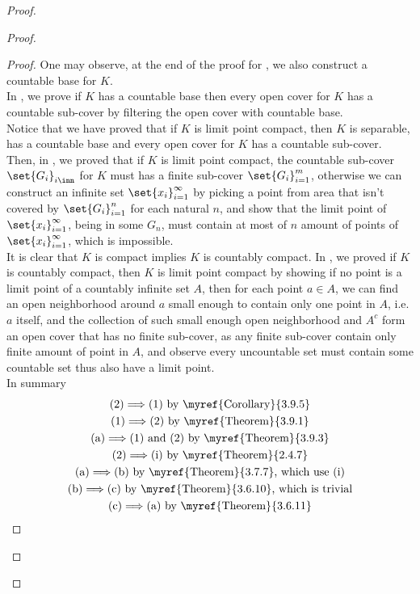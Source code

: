\documentclass{report}
\begin{document}
\begin{proof}
\begin{proof}
\begin{proof}
One may observe, at the end of the proof for , we also construct a countable base for $K$.\\

In  , we prove if  $K$ has a countable base then every open cover for  $K$ has a countable sub-cover by filtering the open cover with countable base.\\

Notice that we have proved that if $K$ is limit point compact, then  $K$ is separable, has a countable base and every open cover for  $K$ has a countable sub-cover.\\

Then, in , we proved that if $K$ is limit point compact, the countable sub-cover $\set{G_i}_{i\inn}$ for $K$ must has a finite sub-cover $\set{G_i}_{i=1}^m$, otherwise we can construct an infinite set $\set{x_i}_{i=1}^\infty$ by picking a point from area that isn't covered by $\set{G_i}_{i=1}^n$ for each natural $n$, and show that the limit point of $\set{x_i}_{i=1}^\infty$, being in some $G_n$, must contain at most of  $n$ amount of points of  $\set{x_i}_{i=1}^\infty$, which is impossible.\\

It is clear that $K$ is compact implies $K$ is countably compact. In  , we proved if $K$ is countably compact, then $K$ is limit point compact by showing if no point is a limit point of a countably infinite set $A$, then for each point $a\in A$, we can find an open neighborhood around $a$ small enough to contain only one point in $A$, i.e.  $a$ itself, and the collection of such small enough open neighborhood and  $A^c$ form an open cover that has no finite sub-cover, as any finite sub-cover contain only finite amount of point in  $A$, and observe every uncountable set must contain some countable set thus also have a limit point.\\

In summary 
\begin{gather*}
\text{(2)$\implies $(1) by \myref{Corollary}{3.9.5}}\\
\text{(1)$\implies $(2) by \myref{Theorem}{3.9.1}}\\
\text{(a)$\implies $(1) and (2) by \myref{Theorem}{3.9.3}}\\
\text{(2)$\implies $(i) by \myref{Theorem}{2.4.7}}\\
\text{(a)$\implies $(b) by \myref{Theorem}{3.7.7}, which use  (i)}\\
\text{(b)$\implies$(c) by \myref{Theorem}{3.6.10}, which is trivial}\\
\text{(c)$\implies $(a) by \myref{Theorem}{3.6.11}}
\end{gather*}
\end{proof}

\end{proof}
\end{proof}
\end{document}
